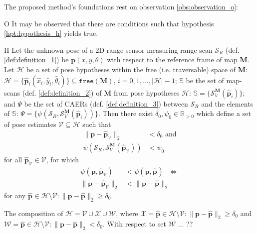 The proposed method's foundations rest on observation \ref{obs:observation_o}:

\begin{customobs}{O}
  \label{obs:observation_o} It may be observed that there are conditions such
  that hypothesis \ref{hpt:hypothesis_h} yields true.
\end{customobs}

\begin{customhpt}{H}
  \label{hpt:hypothesis_h}
  Let the unknown pose of a 2D range sensor measuring range scan $\mathcal{S}_R$
  (def. \ref{def:definition_1}) be $\bm{p}(x,y,\theta)$ with respect to the
  reference frame of map $\bm{M}$.  Let $\mathcal{H}$ be a set of pose
  hypotheses within the free (i.e. traversable) space of $\bm{M}$:
  $\mathcal{H} = \{\hat{\bm{p}}_i(\hat{x}_i,\hat{y}_i,\hat{\theta}_i)\} \subseteq \texttt{free}(\bm{M})$, $i=0,1,\dots,|\mathcal{H}|-1$; $\mathbb{S}$
  be the set of map-scans (def. \ref{def:definition_2}) of $\bm{M}$ from pose
  hypotheses $\mathcal{H}$:
  $\mathbb{S} = \{\mathcal{S}_V^{\bm{M}}(\hat{\bm{p}}_i)\}$; and $\Psi$ be the
  set of CAERs (def. \ref{def:definition_3}) between $\mathcal{S}_R$ and the
  elements of $\mathbb{S}$:
  $\Psi = \{\psi(\mathcal{S}_R, \mathcal{S}_V^{\bm{M}}(\hat{\bm{p}}_i))\}$.
  Then there exist $\delta_0,\psi_0 \in \mathbb{R}_{> 0}$ which define a set of
  pose estimates $\mathcal{V} \subseteq \mathcal{H}$ such that
  \begin{align}
    \|\bm{p}-\hat{\bm{p}}_\mathcal{V}\|_2 &< \delta_0 \nonumber \text{ and}\\
    \psi(\mathcal{S}_R,\mathcal{S}_V^{\bm{M}}(\hat{\bm{p}}_\mathcal{V})) &< \psi_0 \nonumber
  \end{align}
  for all $\hat{\bm{p}}_\mathcal{V} \in \mathcal{V}$, for which
  \begin{align}
    \psi(\bm{p}, \hat{\bm{p}}_\mathcal{V}) &< \psi(\bm{p}, \hat{\bm{p}}_{}) \ \ \ \Leftrightarrow \nonumber \\
    \|\bm{p}-\hat{\bm{p}}_\mathcal{V}\|_2 &< \|\bm{p}-\hat{\bm{p}}_{}\|_2 \nonumber
  \end{align}
  for any $\hat{\bm{p}}_{} \in {\mathcal{H} \setminus  \mathcal{V}}: \|\bm{p}-\hat{\bm{p}}_{}\|_2 \geq \delta_0$.
\end{customhpt}

\begin{remark}
  \label{rem:remark_1}
  The composition of
  $\mathcal{H} = \mathcal{V} \cup \mathcal{X} \cup \mathcal{W}$, where
  $\mathcal{X} = \hat{\bm{p}} \in {\mathcal{H} \setminus \mathcal{V}}: \|\bm{p}-\hat{\bm{p}}\|_2 \geq \delta_0$ and
  $\mathcal{W} = \hat{\bm{p}} \in {\mathcal{H} \setminus \mathcal{V}}: \|\bm{p}-\hat{\bm{p}}\|_2 < \delta_0$.
  With respect to set $\mathcal{W}$ ... ??
\end{remark}


